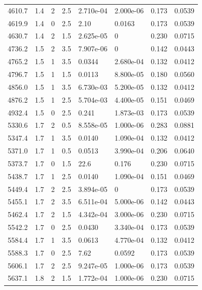 \documentclass[preview]{standalone}
\begin{document}
{{{\begin{tabular}{L{1.2cm}C{1.2cm} C{0.3cm}C{0.5cm} C{1.4cm}C{1.4cm} C{1.4cm}C{1.4cm}}
  4610.7  &   1.4  & 2     & 2.5 &  2.710e-04  & 2.000e-06  & 0.173 &  0.0539   \\ 
  4619.9  &   1.4  & 0     & 2.5 &  2.10  & 0.0163  & 0.173 &  0.0539   \\ 
  4630.7  &   1.4  & 2     & 1.5 &  2.625e-05  & 0  & 0.230 &  0.0715   \\ 
  4736.2  &   1.5  & 2     & 3.5 &  7.907e-06  & 0  & 0.142 &  0.0443   \\ 
  4765.2  &   1.5  & 1     & 3.5 &  0.0344  & 2.680e-04  & 0.132 &  0.0412   \\ 
  4796.7  &   1.5  & 1     & 1.5 &  0.0113  & 8.800e-05  & 0.180 &  0.0560   \\ 
  4856.0  &   1.5  & 1     & 3.5 &  6.730e-03  & 5.200e-05  & 0.132 &  0.0412   \\ 
  4876.2  &   1.5  & 1     & 2.5 &  5.704e-03  & 4.400e-05  & 0.151 &  0.0469   \\ 
  4932.4  &   1.5  & 0     & 2.5 &  0.241  & 1.873e-03  & 0.173 &  0.0539   \\ 
  5330.6  &   1.7  & 2     & 0.5 &  8.558e-05  & 1.000e-06  & 0.283 &  0.0881   \\ 
  5347.4  &   1.7  & 1     & 3.5 &  0.0140  & 1.090e-04  & 0.132 &  0.0412   \\ 
  5371.0  &   1.7  & 1     & 0.5 &  0.0513  & 3.990e-04  & 0.206 &  0.0640   \\ 
  5373.7  &   1.7  & 0     & 1.5 &  22.6  & 0.176  & 0.230 &  0.0715   \\ 
  5438.7  &   1.7  & 1     & 2.5 &  0.0140  & 1.090e-04  & 0.151 &  0.0469   \\ 
  5449.4  &   1.7  & 2     & 2.5 &  3.894e-05  & 0  & 0.173 &  0.0539   \\ 
  5455.1  &   1.7  & 2     & 3.5 &  6.511e-04  & 5.000e-06  & 0.142 &  0.0443   \\ 
  5462.4  &   1.7  & 2     & 1.5 &  4.342e-04  & 3.000e-06  & 0.230 &  0.0715   \\ 
  5542.2  &   1.7  & 0     & 2.5 &  0.0430  & 3.340e-04  & 0.173 &  0.0539   \\ 
  5584.4  &   1.7  & 1     & 3.5 &  0.0613  & 4.770e-04  & 0.132 &  0.0412   \\ 
  5588.3  &   1.7  & 0     & 2.5 &  7.62  & 0.0592  & 0.173 &  0.0539   \\ 
  5606.1  &   1.7  & 2     & 2.5 &  9.247e-05  & 1.000e-06  & 0.173 &  0.0539   \\ 
  5637.1  &   1.8  & 2     & 1.5 &  1.772e-04  & 1.000e-06  & 0.230 &  0.0715   \\ 

\end{tabular}}}}
\end{document}
